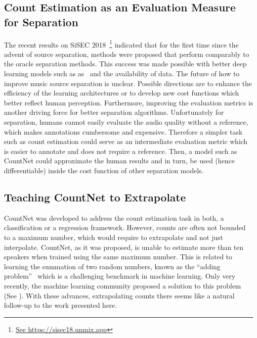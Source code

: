 \subsection*{Count Estimation as an Evaluation Measure for Separation}

The recent results on SiSEC 2018~\cite{stoeter18sisec}\footnote{\url{See https://sisec18.unmix.app}} indicated that for the first time since the advent of source separation, methods were proposed that perform comparably to the oracle separation methods.
This success was made possible with better deep learning models such as as~\cite{takahashi17} and the availability of data.
The future of how to improve music source separation is unclear. Possible directions are to enhance the efficiency of the learning architectures or to develop new cost functions which better reflect human perception.
Furthermore, improving the evaluation metrics is another driving force for better separation algorithms. Unfortunately for separation, humans cannot easily evaluate the audio quality without a reference, which makes annotations cumbersome and expensive.
Therefore a simpler task such as count estimation could serve as an intermediate evaluation metric which is easier to annotate and does not require a reference. Then, a model such as CountNet could approximate the human results and in turn, be used (hence differentiable) inside the cost function of other separation models.

\subsection*{Teaching CountNet to Extrapolate}

CountNet was developed to address the count estimation task in both, a classification or a regression framework.
However, counts are often not bounded to a maximum number, which would require to extrapolate and not just interpolate.
CountNet, as it was proposed, is unable to estimate more than ten speakers when trained using the same maximum number.
This is related to learning the summation of two random numbers, known as the ``adding problem''~\cite{Hochreiter97} which is a challenging benchmark in machine learning.
Only very recently, the machine learning community proposed a solution to this problem (See \cite{trask18}).
With these advances, extrapolating counts there seems like a natural follow-up to the work presented here.
